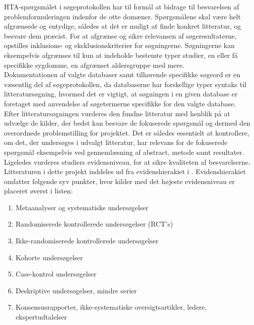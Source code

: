HTA-spørgsmålet i søgeprotokollen har til formål at bidrage til besvarelsen af problemformuleringen indenfor de otte domæner. Spørgsmålene skal være helt afgrænsede og entydige, således at det er muligt at finde konkret litteratur, og besvare dem præcist. \citep{metodehaandbogen}  
For at afgrænse og sikre relevansen af søgeresultaterne, opstilles inklusions- og eksklusionskriterier for søgningerne. Søgningerne kan eksempelvis afgrænses til kun at indeholde bestemte typer studier, en eller få specifikke sygdomme, en afgrænset aldersgruppe med mere. \citep{metodehaandbogen} \\
Dokumentationen af valgte databaser samt tilhørende specifikke søgeord er en væsentlig del af søgeprotokollen, da databaserne har forskellige typer syntaks til litteratursøgning, hvormed det er vigtigt, at søgningen i en given database er foretaget med anvendelse af søgetermerne specifikke for den valgte database. \citep{metodehaandbogen}
Efter litteratursøgningen vurderes den fundne litteratur med henblik på at udvælge de kilder, der bedst kan besvare de fokuserede spørgsmål og dermed den overordnede problemstilling for projektet. Det er således essentielt at kontrollere, om det, der undersøges i udvalgt litteratur, har relevans for de fokuserede spørgsmål eksempelvis ved gennemlæsning af abstract, metode samt resultater. Ligeledes vurderes studiers evidensniveau, for at sikre kvaliteten af besvarelserne. \citep{metodehaandbogen} 
Litteraturen i dette projekt inddeles ud fra evidenshierakiet i . Evidenshierakiet omfatter følgende syv punkter, hvor kilder med det højeste evidensniveau er placeret øverst i listen:


\begin{enumerate}
\item Metaanalyser og systematiske undersøgelser 
\item Randomiserede kontrollerede undersøgelser (RCT’s)
\item Ikke-randomiserede kontrollerede undersøgelser
\item Kohorte undersøgelser
\item Case-kontrol undersøgelser
\item Deskriptive undersøgelser, mindre serier
\item Konsensusrapporter, ikke-systematiske oversigtsartikler, ledere, ekspertudtalelser
\end{enumerate}


